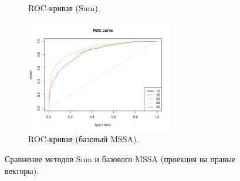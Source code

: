 \documentclass[specialist,
substylefile = spbu_report.rtx,
subf,href,colorlinks=true, 12pt]{disser}
\theoremstyle{definition}
\begin{document}
\begin{figure}[h!]
\begin{subfigure}[t]{0.45\textwidth}
		\caption{ROC-кривая (Sum).}
	\end{subfigure}\hspace{\fill}
	\begin{subfigure}[t]{0.45\textwidth}
		\centering
		\includegraphics[width=0.7\textwidth]{img/roc_mssa_fa.pdf}
		\caption{ROC-кривая (базовый MSSA).}
	\end{subfigure}
	\caption{Сравнение методов Sum и базового MSSA (проекция на правые векторы).}
	\label{fig:sum_fa}
\end{figure}
\end{document}
